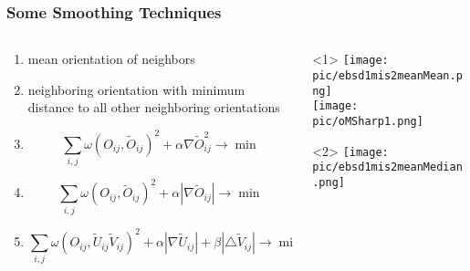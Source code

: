 \documentclass[comptress]{beamer}
\begin{document}
\begin{frame}[fragile]
  \frametitle{Some Smoothing Techniques}

  \vspace{-0.6cm}
  \begin{overlayarea}{\textwidth}{\textheight}
  \begin{columns}
    \begin{column}{8.3cm}
        \begin{enumerate}
        \item<+->  mean orientation
          of neighbors
        \item<+->   neighboring
          orientation with minimum distance to all other neighboring
          orientations
        \item<+->  %
          \begin{equation*}
            \sum_{i,j} \omega(O_{ij},\tilde O_{ij})^{2} + \alpha \nabla
            \tilde O_{ij}^{2} \to \min
          \end{equation*}
        \item<+-> 
          \begin{equation*}
            \sum_{i,j} \omega(O_{ij},\tilde O_{ij})^{2} + \alpha \left|\nabla
            \tilde O_{ij}\right| \to \min
        \end{equation*}
      \item<+-> 
          \begin{equation*}
            \sum_{i,j} \omega(O_{ij},\tilde U_{ij} \tilde V_{ij})^{2} + \alpha \left|\nabla
            \tilde U_{ij}\right| + \beta  \left|\triangle
            \tilde V_{ij}\right| \to \min
          \end{equation*}
        \end{enumerate}
    \end{column}
    \begin{column}{3.8cm}
      \begin{onlyenv}<1>
        \texttt{[image: pic/ebsd1mis2meanMean.png]}\\
        \texttt{[image: pic/oMSharp1.png]}
      \end{onlyenv}
      \begin{onlyenv}<2>
        \texttt{[image: pic/ebsd1mis2meanMedian.png]}\\

\end{onlyenv}
\end{column}
\end{columns}
\end{overlayarea}
\end{frame}
\end{document}
